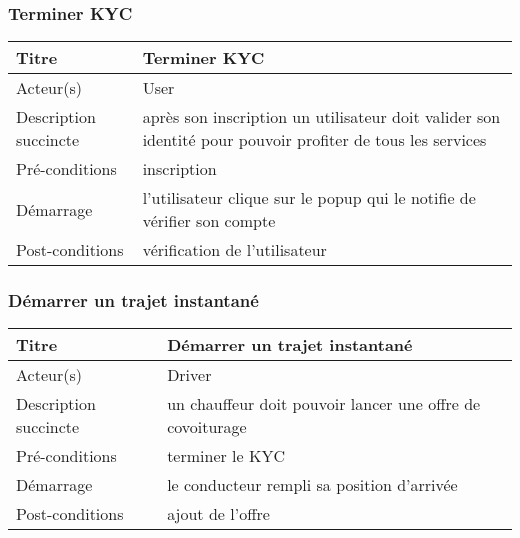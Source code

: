 \subsubsection{Terminer KYC} %
\begin{center}
    \begin{tabular}{ | l | p{10cm} |}
    \hline
    Titre & Terminer KYC \\ \hline
    Acteur(s) & User \\ \hline
    Description succincte & après son inscription un utilisateur doit valider son identité pour pouvoir profiter de tous les services \\ \hline
    Pré-conditions & inscription \\ \hline
    Démarrage & l'utilisateur clique sur le popup qui le notifie de vérifier son compte \\ \hline
    Post-conditions & vérification de l'utilisateur \\ \hline
    \end{tabular}
\end{center}

\subsubsection{Démarrer un trajet instantané} %
\begin{center}
    \begin{tabular}{ | l | p{10cm} |}
    \hline
    Titre & Démarrer un trajet instantané \\ \hline
    Acteur(s) & Driver \\ \hline
    Description succincte & un chauffeur doit pouvoir lancer une offre de covoiturage \\ \hline
    Pré-conditions & terminer le KYC \\ \hline
    Démarrage & le conducteur rempli sa position d'arrivée \\ \hline
    Post-conditions & ajout de l'offre \\ \hline
    \end{tabular}
\end{center}

